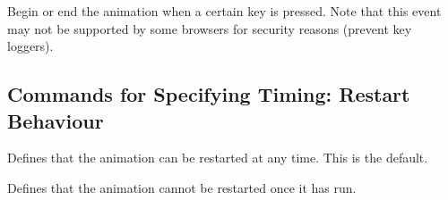 \begin{command}{\pgfsysanimkeyaccesskey{}}
\end{command}
\begin{command}{\pgfsys@animation@accesskey{}}
    Begin or end the animation when a certain key is pressed. Note that this
    event may not be supported by some browsers for security reasons (prevent
    key loggers).
\begin{codeexample}[imagesource={standalone/pgfmanual-en-pgfsys-animations-animation-36.svg}]
\end{codeexample}
\end{command}


\subsection{Commands for Specifying Timing: Restart Behaviour}

\begin{command}{\pgfsysanimkeyrestartalways}
\end{command}
\begin{command}{\pgfsys@animation@restart@always}
    Defines that the animation can be restarted at any time. This is the
    default.
\begin{codeexample}[imagesource={standalone/pgfmanual-en-pgfsys-animations-animation-37.svg}]
\end{codeexample}
\end{command}

\begin{command}{\pgfsysanimkeyrestartnever}
\end{command}
\begin{command}{\pgfsys@animation@restart@never}
    Defines that the animation cannot be restarted once it has run.
\begin{codeexample}[imagesource={standalone/pgfmanual-en-pgfsys-animations-animation-38.svg}]
\end{codeexample}
\end{command}


